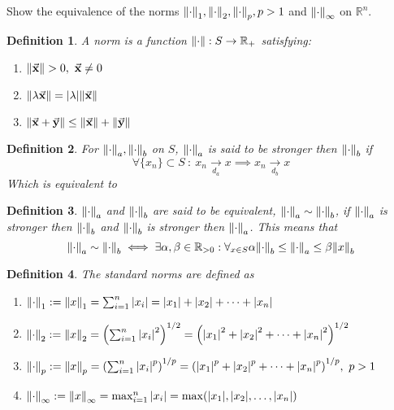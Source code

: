 \documentclass[]{article}
\newcommand{\R}{\mathbb{R}}
\newcommand{\st}{\ : \ }
\newtheorem{definition}{Definition}
\begin{document}
\section{}
Show the equivalence of the norms $\norm{\cdot}_1,\norm{\cdot}_2,\norm{\cdot}_p, p>1$ and $\norm{\cdot}_\infty$ on $\R^n$.
\begin{definition}
    A \emph{norm} is a function $\norm{\cdot} : S \to \R_+$ satisfying:
    \begin{enumerate}
        \item $\norm{\va{x}} > 0, \ \va{x} \neq 0$
        \item $\norm{\lambda \va{x}} = \abs{\lambda} \norm{\va{x}}$
        \item $\norm{\va{x} + \va{y}} \leq \norm{\va{x}} + \norm{\va{y}}$
    \end{enumerate}
\end{definition}
\begin{definition}
    For $\norm{\cdot}_a, \norm{\cdot}_b$ on $S$, 
    $\norm{\cdot}_a$ is said to be \emph{stronger} then $\norm{\cdot}_b$ if 
    \[\forall \{x_n\} \subset S \st x_n \xrightarrow[d_a]{} x \implies x_n \xrightarrow[d_b]{} x\]
    Which is equivalent to 
\end{definition}
\begin{definition}
    $\norm{\cdot}_a$ and $\norm{\cdot}_b$ are said to be \emph{equivalent},  $\norm{\cdot}_a \sim \norm{\cdot}_b$,
    if $\norm{\cdot}_a$ is stronger then $\norm{\cdot}_b$ 
    and $\norm{\cdot}_b$ is stronger then $\norm{\cdot}_a$. 
    This means that
    \[
        \norm{\cdot}_a \sim \norm{\cdot}_b 
            \iff \exists{\alpha,\beta \in \R_{>0}} : 
            \forall_{x\in S} \alpha \norm{\cdot}_b \leq \norm{\cdot}_a \leq \beta \norm{x}_b
    \]
\end{definition}

\begin{definition} The standard norms are defined as
    \begin{enumerate}
        \item $\norm{\cdot}_1 := \norm{x}_1 = \sum_{i=1}^n \abs{x_i} = \abs{x_1} + \abs{x_2} + \dots + \abs{x_n}$
        \item $\norm{\cdot}_2 := \norm{x}_2 = \qty(\sum_{i=1}^n \abs{x_i}^2)^{1/2} = \qty(\abs{x_1}^2 + \abs{x_2}^2 + \dots + \abs{x_n}^2)^{1/2}$
        \item $\norm{\cdot}_p := \norm{x}_p = \qty(\sum_{i=1}^n \abs{x_i}^p)^{1/p} =\qty(\abs{x_1}^p + \abs{x_2}^p + \dots + \abs{x_n}^p)^{1/p}, \ p > 1$
        \item $\norm{\cdot}_\infty := \norm{x}_\infty = \max_{i=1}^n \abs{x_i} = \max(\abs{x_1}, \abs{x_2}, \dots, \abs{x_n})$
    \end{enumerate}
\end{definition}
\end{document}
